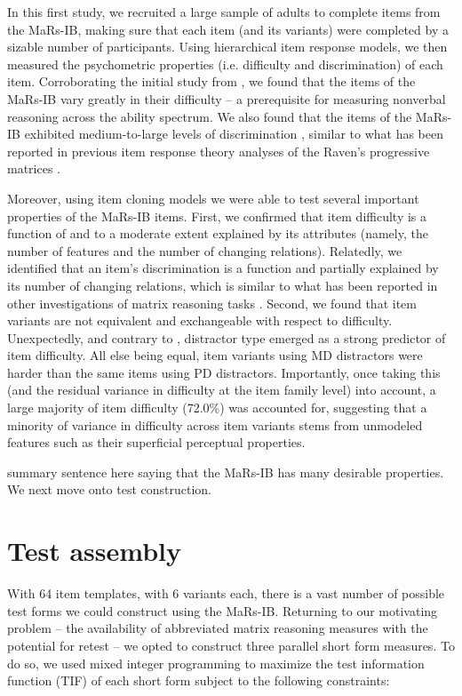 \documentclass[a4paper,man,natbib]{apa6}
\begin{document}
In this first study, we recruited a large sample of adults to complete items from the MaRs-IB, making sure that each item (and its variants) were completed by a sizable number of participants. Using hierarchical item response models, we then measured the psychometric properties (i.e. difficulty and discrimination) of each item. Corroborating the initial study from \cite{chierchia2019matrix}, we found that the items of the MaRs-IB vary greatly in their difficulty -- a prerequisite for measuring nonverbal reasoning across the ability spectrum. We also found that the items of the MaRs-IB exhibited medium-to-large levels of discrimination \citep{baker2017basics}, similar to what has been reported in previous item response theory analyses of the Raven's progressive matrices \citep{chiesi2012using}.

Moreover, using item cloning models we were able to test several important properties of the MaRs-IB items. First, we confirmed that item difficulty is a function of and to a moderate extent explained by its attributes (namely, the number of features and the number of changing relations). Relatedly, we identified that an item's discrimination is a function and partially explained by its number of changing relations, which is similar to what has been reported in other investigations of matrix reasoning tasks \citep{embretson1999generating}. Second, we found that item variants are not equivalent and exchangeable with respect to difficulty. Unexpectedly, and contrary to \cite{chierchia2019matrix}, distractor type emerged as a strong predictor of item difficulty. All else being equal, item variants using MD distractors were harder than the same items using PD distractors. Importantly, once taking this (and the residual variance in difficulty at the item family level) into account, a large majority of item difficulty (72.0\%) was accounted for, suggesting that a minority of variance in difficulty across item variants stems from unmodeled features such as their superficial perceptual properties. 

summary sentence here saying that the MaRs-IB has many desirable properties. We next move onto test construction.

\section{Test assembly}

With 64 item templates, with 6 variants each, there is a vast number of possible test forms we could construct using the MaRs-IB. Returning to our motivating problem -- the availability of abbreviated matrix reasoning measures with the potential for retest -- we opted to construct three parallel short form measures. To do so, we used mixed integer programming \citep{der2005wj} to maximize the test information function (TIF) of each short form subject to the following constraints:
\end{document}
